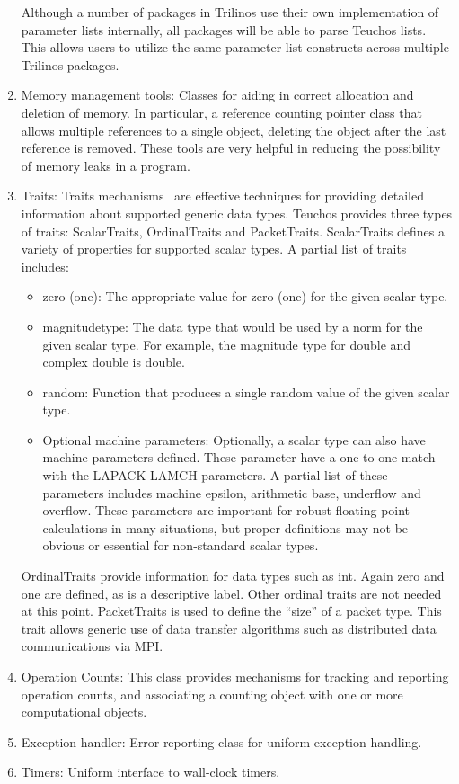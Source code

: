 \documentclass[12pt,relax]{TrilinosOverview}
\begin{document}
\begin{enumerate}
Although a number of packages in Trilinos use their own implementation
of parameter lists internally, all packages will be able to parse
Teuchos lists.  This allows users to utilize the same parameter list
constructs across multiple Trilinos packages.

\item Memory management tools:  Classes for aiding in correct allocation 
and deletion of memory.  In particular, a reference counting pointer class that 
allows multiple references to a single object, deleting the object after the last
reference is removed.  These tools are very helpful in reducing the possibility of
memory leaks in a program.

\item Traits: Traits mechanisms~\cite{MyersTraits} are effective techniques
for providing detailed information about supported generic data types.
Teuchos provides three types of traits: ScalarTraits, OrdinalTraits
and PacketTraits.
ScalarTraits defines a variety of properties for supported scalar
types.  A partial list of traits includes:
\begin{itemize}
\item zero (one): The appropriate value for zero (one) for the given
scalar type.
\item magnitudetype: The data type that would be used by a norm for
the given scalar type.  For example, the magnitude type for double and
complex double is double.
\item random: Function that produces a single random value of the
given scalar type.
\item Optional machine parameters: Optionally, a scalar type can also
have machine parameters defined.  These parameter have a one-to-one
match with the LAPACK LAMCH parameters.  A partial list of these
parameters includes machine epsilon, arithmetic base, underflow and
overflow.  These parameters are important for robust floating point
calculations in many situations, but proper definitions may not be
obvious or essential for non-standard scalar types.
\end{itemize}

OrdinalTraits provide information for data types such as int.  Again
zero and one are defined, as is a descriptive label.  Other ordinal traits are
not needed at this point.  PacketTraits is used to define the ``size'' of a packet type.  This
trait allows generic use of data transfer algorithms such as
distributed data communications via MPI.

\item Operation Counts: This class provides mechanisms for tracking
and reporting operation counts, and associating a counting object with
one or more computational objects.

\item Exception handler:  Error reporting class for uniform exception
handling.

\item Timers:  Uniform interface to wall-clock timers.

\end{enumerate}
\end{document}
